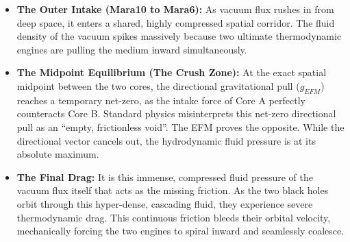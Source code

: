 \documentclass[11pt, a4paper]{article}
\begin{document}
\begin{itemize}
  \item \textbf{The Outer Intake (Mara10 to Mara6):} As vacuum flux rushes in from deep space, it enters a shared, highly compressed spatial corridor. The fluid density of the vacuum spikes massively because two ultimate thermodynamic engines are pulling the medium inward simultaneously.
  \item \textbf{The Midpoint Equilibrium (The Crush Zone):} At the exact spatial midpoint between the two cores, the directional gravitational pull ($g_{EFM}$) reaches a temporary net-zero, as the intake force of Core A perfectly counteracts Core B. Standard physics misinterprets this net-zero directional pull as an ``empty, frictionless void''. The EFM proves the opposite. While the directional vector cancels out, the hydrodynamic fluid pressure is at its absolute maximum.
  \item \textbf{The Final Drag:} It is this immense, compressed fluid pressure of the vacuum flux itself that acts as the missing friction. As the two black holes orbit through this hyper-dense, cascading fluid, they experience severe thermodynamic drag. This continuous friction bleeds their orbital velocity, mechanically forcing the two engines to spiral inward and seamlessly coalesce.
\end{itemize}
\end{document}
